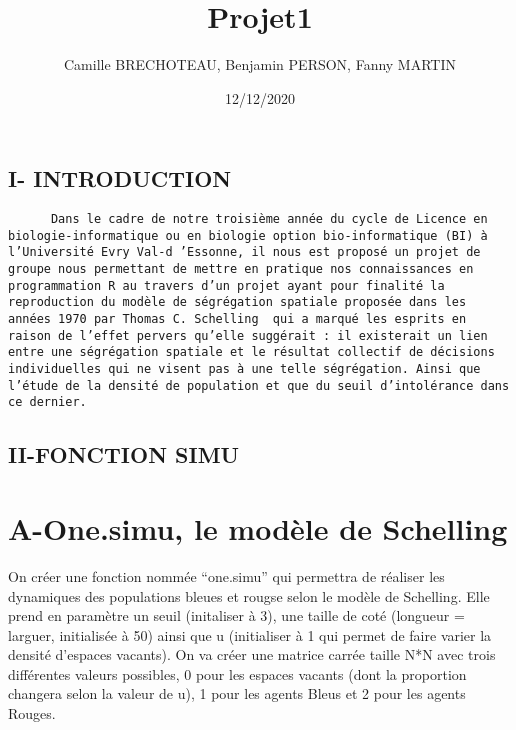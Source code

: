 \documentclass[
]{article}
\title{Projet1}
\author{Camille BRECHOTEAU, Benjamin PERSON, Fanny MARTIN}
\date{12/12/2020}
\begin{document}
\maketitle

\hypertarget{i--introduction}{%
\subsection{I- INTRODUCTION}\label{i--introduction}}

\begin{verbatim}
      Dans le cadre de notre troisième année du cycle de Licence en biologie-informatique ou en biologie option bio-informatique (BI) à l’Université Evry Val-d ’Essonne, il nous est proposé un projet de groupe nous permettant de mettre en pratique nos connaissances en programmation R au travers d’un projet ayant pour finalité la reproduction du modèle de ségrégation spatiale proposée dans les années 1970 par Thomas C. Schelling  qui a marqué les esprits en raison de l’effet pervers qu’elle suggérait : il existerait un lien entre une ségrégation spatiale et le résultat collectif de décisions individuelles qui ne visent pas à une telle ségrégation. Ainsi que l’étude de la densité de population et que du seuil d’intolérance dans ce dernier.
\end{verbatim}

\hypertarget{ii-fonction-simu}{%
\subsection{II-FONCTION SIMU}\label{ii-fonction-simu}}

\hypertarget{a-one.simu-le-moduxe8le-de-schelling}{%
\section{A-One.simu, le modèle de
Schelling}\label{a-one.simu-le-moduxe8le-de-schelling}}

On créer une fonction nommée ``one.simu'' qui permettra de réaliser les
dynamiques des populations bleues et rougse selon le modèle de
Schelling. Elle prend en paramètre un seuil (initaliser à 3), une taille
de coté (longueur = larguer, initialisée à 50) ainsi que u (initialiser
à 1 qui permet de faire varier la densité d'espaces vacants). On va
créer une matrice carrée taille N*N avec trois différentes valeurs
possibles, 0 pour les espaces vacants (dont la proportion changera selon
la valeur de u), 1 pour les agents Bleus et 2 pour les agents Rouges.
\end{document}
